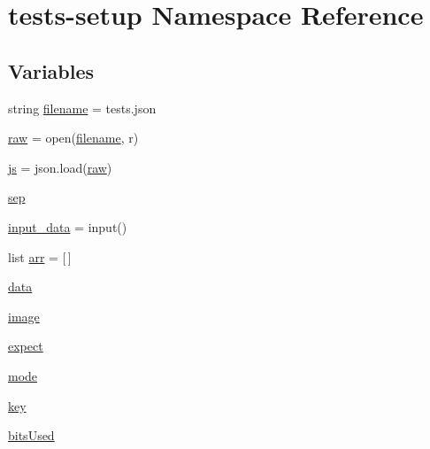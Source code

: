 \hypertarget{namespacetests-setup}{}\section{tests-\/setup Namespace Reference}
\label{namespacetests-setup}
\subsection*{Variables}
\begin{DoxyCompactItemize}
\item 
string \mbox{\hyperlink{namespacetests-setup_a1c1b6d4c14026d664106586c65e10a94}{filename}} = \textquotesingle{}tests.\+json\textquotesingle{}
\item 
\mbox{\hyperlink{namespacetests-setup_a16d40f6dd9430f3bdc79db2d00aab267}{raw}} = open(\mbox{\hyperlink{namespacetests-setup_a1c1b6d4c14026d664106586c65e10a94}{filename}}, \textquotesingle{}r\textquotesingle{})
\item 
\mbox{\hyperlink{namespacetests-setup_a94275a2f2d070d13dedc7e8dfaf4faa0}{js}} = json.\+load(\mbox{\hyperlink{namespacetests-setup_a16d40f6dd9430f3bdc79db2d00aab267}{raw}})
\item 
\mbox{\hyperlink{namespacetests-setup_a92ab4d3dccd0fc5347ed0f5399869803}{sep}}
\item 
\mbox{\hyperlink{namespacetests-setup_a1e5de3b19e0107100d5df9b7e2122764}{input\+\_\+data}} = input()
\item 
list \mbox{\hyperlink{namespacetests-setup_a274aaa7c0d5733ef5f48372d9481f34a}{arr}} = \mbox{[}$\,$\mbox{]}
\item 
\mbox{\hyperlink{namespacetests-setup_a6b4da66e7d24a18856de9023a2dcede4}{data}}
\item 
\mbox{\hyperlink{namespacetests-setup_ad55b685280f549e15688a94cbb89f512}{image}}
\item 
\mbox{\hyperlink{namespacetests-setup_a2c17344dec99b9aaaddaef4438b1f793}{expect}}
\item 
\mbox{\hyperlink{namespacetests-setup_a04126d10edec6b3171e1b55a00309b23}{mode}}
\item 
\mbox{\hyperlink{namespacetests-setup_a3a21e3298c630c17fc27ca5ab146a8af}{key}}
\item 
\mbox{\hyperlink{namespacetests-setup_a64974eb034f518d24195739395783d3d}{bits\+Used}}
\item 

\end{DoxyCompactItemize}
